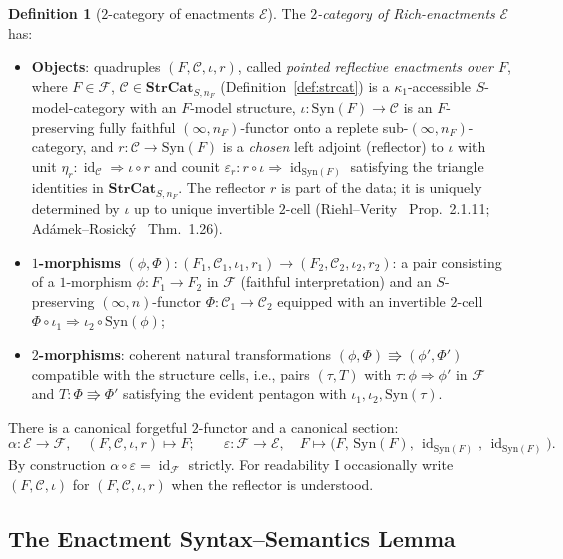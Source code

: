 \documentclass[11pt]{article}
\theoremstyle{plain}
\theoremstyle{definition}
\newtheorem{definition}[theorem]{Definition}
\newcommand{\cF}{\mathcal{F}}
\newcommand{\cC}{\mathcal{C}}
\newcommand{\Syn}{\mathrm{Syn}}
\newcommand{\cE}{\mathcal{E}}
\DeclareMathOperator{\id}{id}
\begin{document}
\begin{definition}[$2$-category of enactments $\cE$]\label{def:enactments}
The \emph{$2$-category of Rich-enactments} $\cE$ has:
\begin{itemize}
\item \textbf{Objects}: quadruples $(F, \cC, \iota, r)$, called \emph{pointed reflective enactments over $F$}, where $F \in \cF$, $\cC \in \mathbf{StrCat}_{S, n_F}$ (Definition~\ref{def:strcat}) is a $\kappa_1$-accessible $S$-model-category with an $F$-model structure, $\iota : \Syn(F) \to \cC$ is an $F$-preserving fully faithful $(\infty, n_F)$-functor onto a replete sub-$(\infty, n_F)$-category, and $r : \cC \to \Syn(F)$ is a \emph{chosen} left adjoint (reflector) to $\iota$ with unit $\eta_r : \id_\cC \Rightarrow \iota \circ r$ and counit $\varepsilon_r : r \circ \iota \Rightarrow \id_{\Syn(F)}$ satisfying the triangle identities in $\mathbf{StrCat}_{S, n_F}$. The reflector $r$ is part of the data; it is uniquely determined by $\iota$ up to unique invertible $2$-cell (Riehl--Verity~\cite{RiehlVerity2022} Prop.~2.1.11; Ad\'amek--Rosick\'y~\cite{AdamekRosicky1994} Thm.~1.26).
\item \textbf{$1$-morphisms} $(\phi, \Phi) : (F_1, \cC_1, \iota_1, r_1) \to (F_2, \cC_2, \iota_2, r_2)$: a pair consisting of a $1$-morphism $\phi : F_1 \to F_2$ in $\cF$ (faithful interpretation) and an $S$-preserving $(\infty, n)$-functor $\Phi : \cC_1 \to \cC_2$ equipped with an invertible $2$-cell $\Phi \circ \iota_1 \Rightarrow \iota_2 \circ \Syn(\phi)$;
\item \textbf{$2$-morphisms}: coherent natural transformations $(\phi, \Phi) \Rrightarrow (\phi', \Phi')$ compatible with the structure cells, i.e., pairs $(\tau, T)$ with $\tau : \phi \Rightarrow \phi'$ in $\cF$ and $T : \Phi \Rrightarrow \Phi'$ satisfying the evident pentagon with $\iota_1, \iota_2, \Syn(\tau)$.
\end{itemize}
There is a canonical forgetful $2$-functor and a canonical section:
\[
  \alpha : \cE \to \cF, \quad (F, \cC, \iota, r) \mapsto F; \qquad
  \varepsilon : \cF \to \cE, \quad F \mapsto \bigl(F,\, \Syn(F),\, \id_{\Syn(F)},\, \id_{\Syn(F)}\bigr).
\]
By construction $\alpha \circ \varepsilon = \id_\cF$ strictly. For readability I occasionally write $(F, \cC, \iota)$ for $(F, \cC, \iota, r)$ when the reflector is understood.
\end{definition}

\subsection{The Enactment Syntax--Semantics Lemma}
\end{document}
